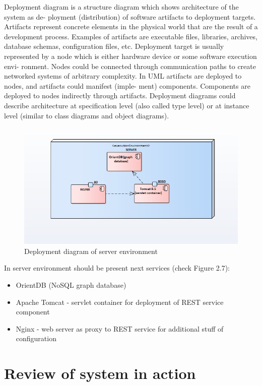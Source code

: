 \documentclass[12pt,a4paper,titlepage]{article}
\begin{document}
Deployment diagram is a structure diagram which shows architecture of the system as de-
ployment (distribution) of software artifacts to deployment targets. Artifacts represent concrete
elements in the physical world that are the result of a development process. Examples of artifacts
are executable files, libraries, archives, database schemas, configuration files, etc. Deployment target
is usually represented by a node which is either hardware device or some software execution envi-
ronment. Nodes could be connected through communication paths to create networked systems of
arbitrary complexity. In UML artifacts are deployed to nodes, and artifacts could manifest (imple-
ment) components. Components are deployed to nodes indirectly through artifacts. Deployment
diagrams could describe architecture at specification level (also called type level) or at instance level
(similar to class diagrams and object diagrams).

\begin{figure}[!ht] 
	\renewcommand\thefigure{2.7} %
	\centering 
	\includegraphics[width=17cm]{dep.png} 
	\caption{ Deployment diagram of server environment }\label{fig:2.5}
	\end{figure}


In server environment should be present next services (check Figure 2.7):
\begin{itemize}
\item OrientDB (NoSQL graph database)
\item Apache Tomcat - servlet container for deployment of REST service component
\item Nginx - web server as proxy to REST service for additional stuff of configuration
\end{itemize}


\newpage
\section{Review of system in action}
\end{document}
